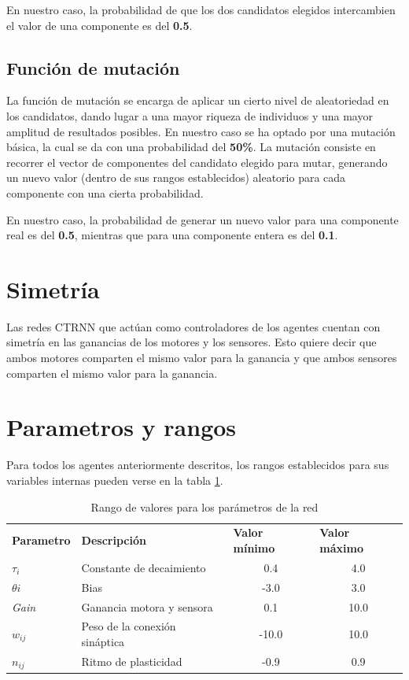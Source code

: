 En nuestro caso, la probabilidad de que los dos candidatos elegidos intercambien el valor de una componente es del \textbf{0.5}.

\subsection{Función de mutación}
La función de mutación se encarga de aplicar un cierto nivel de aleatoriedad en los candidatos, dando lugar a una mayor riqueza de individuos y una mayor amplitud de resultados posibles. En nuestro caso se ha optado por una mutación básica, la cual se da con una probabilidad del \textbf{50\%}.
La mutación consiste en recorrer el vector de componentes del candidato elegido para mutar, generando un nuevo valor (dentro de sus rangos establecidos) aleatorio para cada componente con una cierta probabilidad.

En nuestro caso, la probabilidad de generar un nuevo valor para una componente real es del \textbf{0.5}, mientras que para una componente entera es del \textbf{0.1}.

\section{Simetría}
Las redes CTRNN que actúan como controladores de los agentes cuentan con simetría en las ganancias de los motores y los sensores. Esto quiere decir que ambos motores comparten el mismo valor para la ganancia y que ambos sensores
comparten el mismo valor para la ganancia.

\section{Parametros y rangos}
Para todos los agentes anteriormente descritos, los rangos establecidos para sus variables internas pueden verse en la tabla \ref{table:tablaValoresParametros}.
\begin{table}[H]
\centering
\begin{tabular}{l|l|c|c}
\textbf{Parametro} & \textbf{Descripción}          & \multicolumn{1}{l|}{\textbf{Valor mínimo}} & \multicolumn{1}{l}{\textbf{Valor máximo}} \\
\textit{$\tau_{i}$}       & Constante de decaimiento      & 0.4                                        & 4.0                                       \\
\textit{$\theta{i}$}      & Bias                          & -3.0                                       & 3.0                                       \\
\textit{Gain}      & Ganancia motora y sensora     & 0.1                                        & 10.0                                      \\
\textit{$w_{ij}$}      & Peso de la conexión sináptica & -10.0                                      & 10.0                                      \\
\textit{$n_{ij}$}     & Ritmo de plasticidad          & -0.9                                       & 0.9
\end{tabular}
\caption{Rango de valores para los parámetros de la red}
 \label{table:tablaValoresParametros}
\end{table}
